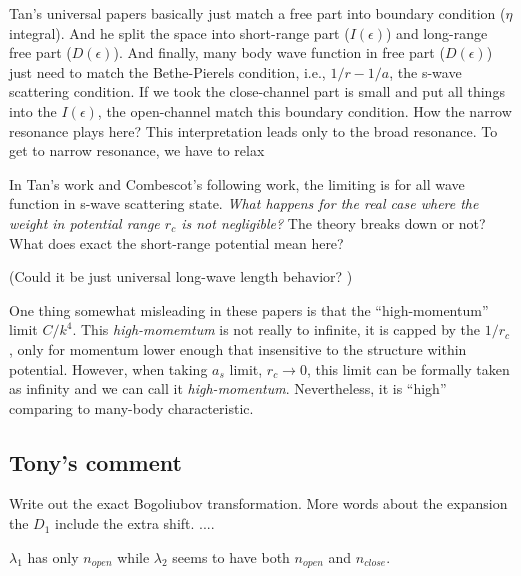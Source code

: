 Tan's universal papers\cite{Tan2008-1,Tan2008-2} basically just match a free part into boundary condition ($\eta$ integral).  And he split the space into short-range part ($I(\epsilon)$) and long-range free part ($D(\epsilon)$).  And finally, many body wave function in free part ($D(\epsilon)$) just need to match the Bethe-Pierels condition, i.e., $1/r-1/a$, the s-wave scattering condition.  If we took the close-channel part is small and put all things into the $I(\epsilon)$, the open-channel match this boundary condition.  How the narrow resonance plays here? This interpretation leads only to the broad resonance. To get to narrow resonance, we have to relax 


In Tan's work and Combescot's following work\cite{CombescotTan}, the limiting is for all wave function in s-wave scattering state. \emph{What happens for the real case where the weight in potential range $r_{c}$ is not negligible?} The theory breaks down or not?  What does exact the short-range potential mean here?

(Could it be just universal long-wave length behavior? )

One thing somewhat misleading in these papers is that the ``high-momentum'' limit $C/k^{4}$.  This \emph{high-momemtum} is not really to infinite, it is capped by the $1/r_{c}$, only for momentum lower enough that insensitive to the structure within potential.  However, when taking $a_{s}$ limit, $r_{c}\rightarrow0$, this limit can be formally taken as infinity and we can call it \emph{high-momentum}.  Nevertheless, it is ``high'' comparing to many-body characteristic.  


\subsection{Tony's comment}
Write out the exact Bogoliubov transformation.  More words about the expansion the $D_{1}$ include the extra shift.  ....


$\lambda_{1}$ has only $n_{open}$ while $\lambda_{2}$ seems to have both $n_{open}$ and $n_{close}$. 

